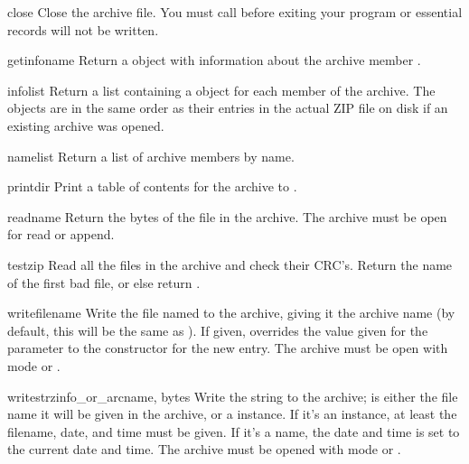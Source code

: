 \begin{methoddesc}{close}{}
  Close the archive file.  You must call  before
  exiting your program or essential records will not be written. 
\end{methoddesc}

\begin{methoddesc}{getinfo}{name}
  Return a  object with information about the archive
  member .
\end{methoddesc}

\begin{methoddesc}{infolist}{}
  Return a list containing a  object for each member of
  the archive.  The objects are in the same order as their entries in
  the actual ZIP file on disk if an existing archive was opened.
\end{methoddesc}

\begin{methoddesc}{namelist}{}
  Return a list of archive members by name.
\end{methoddesc}

\begin{methoddesc}{printdir}{}
  Print a table of contents for the archive to .
\end{methoddesc}

\begin{methoddesc}{read}{name}
  Return the bytes of the file in the archive.  The archive must be
  open for read or append.
\end{methoddesc}

\begin{methoddesc}{testzip}{}
  Read all the files in the archive and check their CRC's.  Return the
  name of the first bad file, or else return .
\end{methoddesc}

\begin{methoddesc}{write}{filename}
  Write the file named  to the archive, giving it the
  archive name  (by default, this will be the same as
  ).  If given,  overrides the value
  given for the  parameter to the constructor for
  the new entry.  The archive must be open with mode  or
  . 
\end{methoddesc}

\begin{methoddesc}{writestr}{zinfo_or_arcname, bytes}
  Write the string  to the archive; 
  is either the file name it will be given in the archive, or a
   instance.  If it's an instance, at least the
  filename, date, and time must be given.  If it's a name, the date
  and time is set to the current date and time. The archive must be
  opened with mode  or .
\end{methoddesc}


